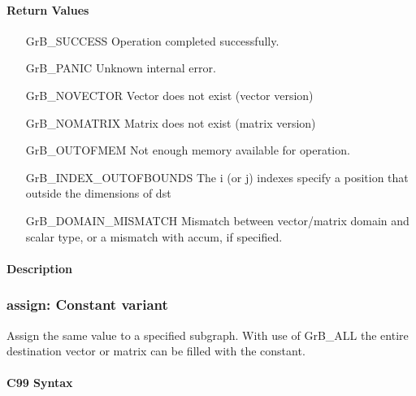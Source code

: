 \paragraph{Return Values}

\begin{itemize}[leftmargin=2.1in]
\item[{\sf GrB\_SUCCESS}]             Operation completed successfully.
\item[{\sf GrB\_PANIC}]               Unknown internal error.
\item[{\sf GrB\_NOVECTOR}]            Vector does not exist (vector version)
\item[{\sf GrB\_NOMATRIX}]            Matrix does not exist (matrix version)
\item[{\sf GrB\_OUTOFMEM}]            Not enough memory available for operation.
\item[{\sf GrB\_INDEX\_OUTOFBOUNDS}]  The i (or j) indexes specify a position that outside the dimensions of dst
\item[{\sf GrB\_DOMAIN\_MISMATCH}]    Mismatch between vector/matrix domain and scalar type,
                                      or a mismatch with {\sf accum}, if specified.
\end{itemize}

\paragraph{Description}

\subsubsection{{\sf assign}: Constant variant}

Assign the same value to a specified subgraph.  With use of {\sf GrB\_ALL} the entire
destination vector or matrix can be filled with the constant.


\paragraph{C99 Syntax}

